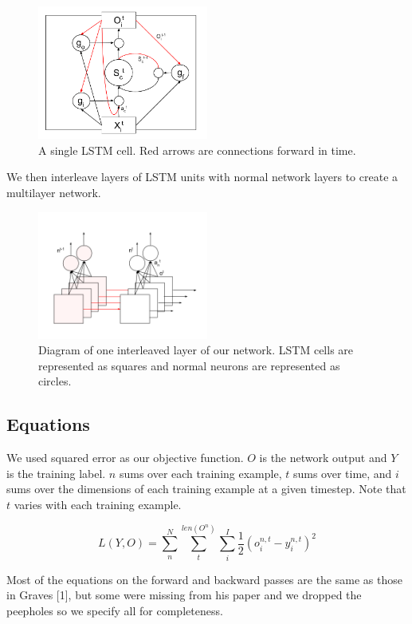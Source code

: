 \documentclass[11pt]{article}
\begin{document}
\begin{figure}[ht]
\caption{A single LSTM cell. Red arrows are connections forward in time.}
  \centering
    \includegraphics[width=0.5\textwidth]{lstm_cell}
\end{figure}

We then interleave layers of LSTM units with
normal network layers to create a multilayer network.

\begin{figure}[ht]
\caption{Diagram of one interleaved layer of our network. LSTM 
cells are represented as squares and normal neurons are represented
as circles.}
  \centering
    \includegraphics[width=0.5\textwidth]{lstm_network}
\end{figure}

\subsection{Equations}

We used squared error as our objective function. \(O\) is the network
output and \(Y\) is the training label. \(n\) sums over each
training example, \(t\) sums over time, and \(i\) sums over the dimensions
of each training example at a given timestep.
Note that \(t\) varies with each training example.

\[  L(Y, O) = \sum_{n}^{N}  \sum_{t}^{len(O^{n})} \sum_{i}^{I} \frac{1}{2} (o_{i}^{n,t} - y_{i}^{n,t})^{2} \]

Most of the equations on the forward and backward passes are the
same as those in Graves [1], but some were missing from his paper
and we dropped the peepholes so we specify all for completeness.
\end{document}
